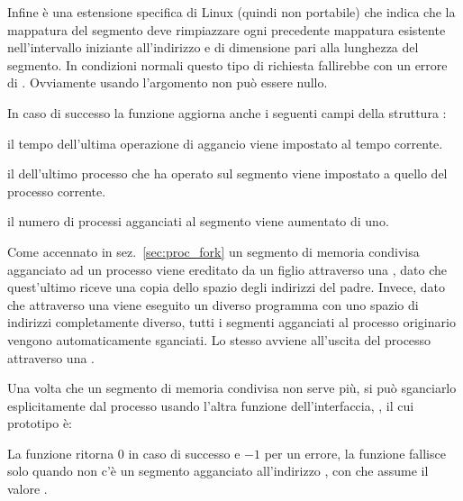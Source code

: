 Infine  è una estensione specifica di Linux (quindi non
portabile) che indica che la mappatura del segmento deve rimpiazzare ogni
precedente mappatura esistente nell'intervallo iniziante
all'indirizzo  e di dimensione pari alla lunghezza del
segmento. In condizioni normali questo tipo di richiesta fallirebbe con un
errore di . Ovviamente usando 
l'argomento  non può essere nullo.

In caso di successo la funzione  aggiorna anche i seguenti campi
della struttura :
\begin{itemize*}
\item il tempo  dell'ultima operazione di aggancio viene
  impostato al tempo corrente.
\item il   dell'ultimo processo che ha operato sul
  segmento viene impostato a quello del processo corrente.
\item il numero  di processi agganciati al segmento viene
  aumentato di uno.
\end{itemize*}

Come accennato in sez.~\ref{sec:proc_fork} un segmento di memoria condivisa
agganciato ad un processo viene ereditato da un figlio attraverso una
, dato che quest'ultimo riceve una copia dello spazio degli
indirizzi del padre. Invece, dato che attraverso una  viene
eseguito un diverso programma con uno spazio di indirizzi completamente
diverso, tutti i segmenti agganciati al processo originario vengono
automaticamente sganciati. Lo stesso avviene all'uscita del processo
attraverso una .

Una volta che un segmento di memoria condivisa non serve più, si può
sganciarlo esplicitamente dal processo usando l'altra funzione
dell'interfaccia, , il cui prototipo è:

\begin{funcproto}{

}

{La funzione ritorna $0$ in caso di successo e $-1$ per un errore, la funzione
  fallisce solo quando non c'è un segmento agganciato
  all'indirizzo , con  che assume il valore
  .  
}  
\end{funcproto}

